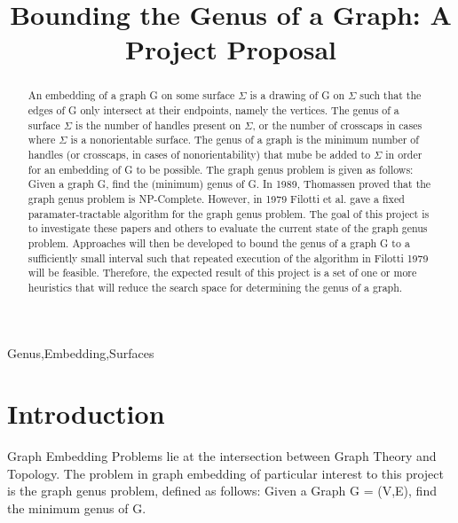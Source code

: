 \documentclass[12pt,conference]{IEEEtran}
\begin{document}
\raggedbottom

\title{Bounding the Genus of a Graph: A Project Proposal}

\author{
}

\maketitle

\begin{abstract}

An embedding of a graph G on some surface $\Sigma$ is a drawing of G on $\Sigma$ such that the edges of G only intersect at their endpoints, namely the vertices. The genus of a surface $\Sigma$ is the number of handles present on $\Sigma$, or the number of crosscaps in cases where $\Sigma$ is a nonorientable surface. The genus of a graph is the minimum number of handles (or crosscaps, in cases of nonorientability) that mube be added to $\Sigma$ in order for an embedding of G to be possible. The graph genus problem is given as follows: Given a graph G, find the (minimum) genus of G. In 1989, Thomassen proved that the graph genus problem is NP-Complete. However, in 1979 Filotti et al. gave a fixed paramater-tractable algorithm for the graph genus problem. The goal of this project is to investigate these papers and others to evaluate the current state of the graph genus problem. Approaches will then be developed to bound the genus of a graph G to a sufficiently small interval such that repeated execution of the algorithm in Filotti 1979 will be feasible. Therefore, the expected result of this project is a set of one or more heuristics that will reduce the search space for determining the genus of a graph.

\end{abstract}

\begin{IEEEkeywords}
Genus,Embedding,Surfaces
\end{IEEEkeywords}

\section{Introduction}

Graph Embedding Problems lie at the intersection between Graph Theory and Topology. The problem in graph embedding of particular interest to this project is the graph genus problem, defined as follows: Given a Graph G = (V,E), find the minimum genus of G. 
\end{document}
